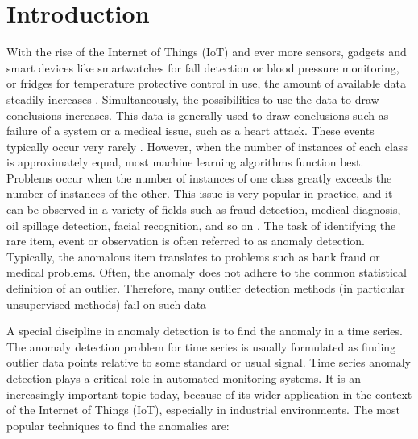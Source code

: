 
\chapter{Introduction} %

\label{1.} %


\newcommand{\keyword}[1]{\textbf{#1}}
\newcommand{\tabhead}[1]{\textbf{#1}}
\newcommand{\code}[1]{\texttt{#1}}
\newcommand{\file}[1]{\texttt{\bfseries#1}}
\newcommand{\option}[1]{\texttt{\itshape#1}}




With the rise of the Internet of Things (IoT) and ever more sensors, gadgets and smart devices like smartwatches for fall detection or blood pressure monitoring, or fridges for temperature protective control in use, the amount of available data steadily increases \parencite{Alansari2018}. Simultaneously, the possibilities to use the data to draw conclusions increases. This data is generally used to draw conclusions such as failure of a system or a medical issue, such as a heart attack. These events typically occur very rarely \parencite{Hauskrecht2007}. However, when the number of instances of each class is approximately equal, most machine learning algorithms function best. Problems occur when the number of instances of one class greatly exceeds the number of instances of the other. This issue is very popular in practice, and it can be observed in a variety of fields such as fraud detection, medical diagnosis, oil spillage detection, facial recognition, and so on \parencite{Thabtah2020}. The task of identifying the rare item, event or observation is often referred to as anomaly detection. Typically, the anomalous item translates to problems such as bank fraud or medical problems. Often, the anomaly does not adhere to the common statistical definition of an outlier. Therefore, many outlier detection methods (in particular unsupervised methods) fail on such data \parencite{Hodge2004}

A special discipline in anomaly detection is to find the anomaly in a time series. The anomaly detection problem for time series is usually formulated as finding outlier data points relative to some standard or usual signal. Time series anomaly detection plays a critical role in automated monitoring systems. It is an increasingly important topic today, because of its wider application in the context of the Internet of Things (IoT), especially in industrial environments. The most popular techniques to find the anomalies are:

